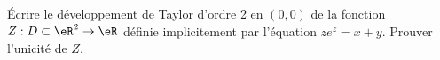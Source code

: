 
\begin{exercice}\label{exoImplicite0003}

Écrire le développement de Taylor d'ordre 2 en $(0,0)$ de la fonction $Z:
D \subset \eR^2 \rightarrow  \eR$ définie implicitement par l'équation
$ze^z = x+y$. Prouver l'unicité de $Z$.

\end{exercice}
